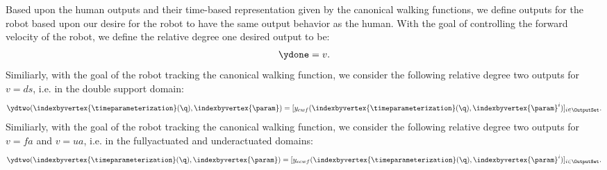  Based upon the human outputs and their time-based representation given by the canonical walking functions, we define outputs for the robot based upon our desire for the robot to have the same output behavior as the human. With the goal of controlling the forward velocity of the robot, we define the relative degree one desired output to be:
\begin{align}
 \ydone = v.
\end{align}
Similiarly, with the goal of the robot tracking the canonical walking function, we consider the following relative degree two outputs for $v = ds$, i.e. in the double support domain:
\begin{align}
 \ydtwo(\indexbyvertex{\timeparameterization}(\q),\indexbyvertex{\param}) = [y_{cwf}(\indexbyvertex{\timeparameterization}(\q),\indexbyvertex{\param}^i)]_{i \in \OutputSet}.
\end{align}
Similiarly, with the goal of the robot tracking the canonical walking function, we consider the following relative degree two outputs for $v = fa$ and $v=ua$, i.e. in the fullyactuated and underactuated domains:
\begin{align}
 \ydtwo(\indexbyvertex{\timeparameterization}(\q),\indexbyvertex{\param}) = [y_{ecwf}(\indexbyvertex{\timeparameterization}(\q),\indexbyvertex{\param}^i)]_{i \in \OutputSet}.
\end{align}

